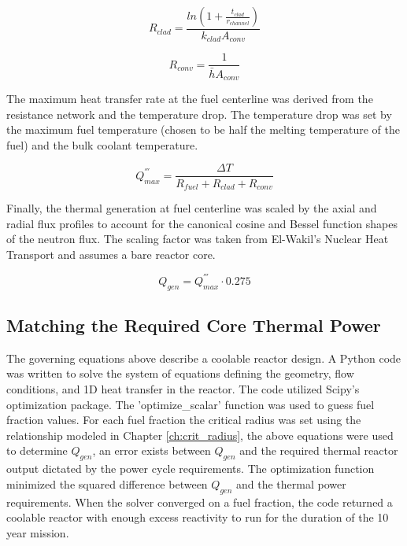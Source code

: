 \begin{equation}
    R_{clad} = \frac{ln(1+\frac{t_{clad}}{r_{channel}})}{k_{clad}A_{conv}}
\end{equation}

\begin{equation}
    R_{conv} = \frac{1}{\bar{h}A_{conv}}
\end{equation}

The maximum heat transfer rate at the fuel centerline was derived from the
resistance network and the temperature drop. The temperature drop was set
by the maximum fuel temperature (chosen to be half the melting temperature of
the fuel) and the bulk coolant temperature.

\begin{equation}
    Q^{'''}_{max} = \frac{\Delta T}{R_{fuel} + R_{clad} + R_{conv}}
\end{equation}

Finally, the thermal generation at fuel centerline was scaled by the axial and
radial flux profiles to account for the canonical cosine and Bessel function
shapes of the neutron flux. The scaling factor was taken from
El-Wakil's Nuclear Heat Transport \citep{heat_trans_wakil} and assumes a 
bare reactor core.

\begin{equation}
    Q_{gen} = Q^{'''}_{max} \cdot 0.275
\end{equation}

\subsection{Matching the Required Core Thermal Power}
The governing equations above describe a coolable
reactor design. A Python code was written to solve the system of equations
defining the geometry, flow conditions, and 1D heat transfer in the reactor. The
code utilized Scipy's optimization package. The 'optimize\_scalar' function was
used to guess fuel fraction values. For each fuel fraction the critical radius
was set using the relationship modeled in Chapter \ref{ch:crit_radius}, the above equations
were used to determine $Q_{gen}$, an error exists between $Q_{gen}$ and the
required thermal reactor output dictated by the power cycle requirements. The
optimization function minimized the squared difference between $Q_{gen}$ and the
thermal power requirements. When the solver converged on a fuel fraction, the
code returned a coolable reactor with enough excess reactivity to run for the
duration of the 10 year mission.

